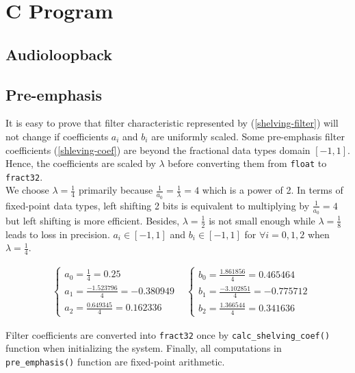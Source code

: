 \section{C Program}
\label{section:c_program}

\subsection{Audioloopback}


\subsection{Pre-emphasis}

It is easy to prove that filter characteristic represented by (\ref{shelving-filter}) will not change if coefficients $a_i$ and $b_i$ are uniformly scaled. Some pre-emphasis filter coefficients (\ref{shleving-coef}) are beyond the fractional data types domain $[-1, 1]$. Hence, the coefficients are scaled by $\lambda$ before converting them from \texttt{float} to \texttt{fract32}.\\

We choose $\lambda = \frac{1}{4}$ primarily because $\frac{1}{a_0} = \frac{1}{\lambda} = 4$ which is a power of 2. In terms of fixed-point data types, left shifting 2 bits is equivalent to multiplying by $\frac{1}{a_0} = 4$ but left shifting is more efficient. Besides, $\lambda = \frac{1}{2}$ is not small enough while $\lambda = \frac{1}{8}$ leads to loss in precision. $a_i \in [-1, 1]$ and $b_i \in [-1, 1]$ for $\forall i = 0, 1, 2$ when $\lambda = \frac{1}{4}$.

\begin{align*}
&\begin{cases}
a_0 = \frac{1}{4} = 0.25\\
a_1 = \frac{-1.523796}{4} = -0.380949\\
a_2 = \frac{0.649345}{4} = 0.162336
\end{cases}
&\begin{cases}
b_0 = \frac{1.861856}{4} = 0.465464\\
b_1 = \frac{-3.102851}{4} = -0.775712\\
b_2 = \frac{1.366544}{4} = 0.341636
\end{cases}
\end{align*}

Filter coefficients are converted into \texttt{fract32} once by \texttt{calc\_shelving\_coef()} function when initializing the system. Finally, all computations in \texttt{pre\_emphasis()} function are fixed-point arithmetic.

